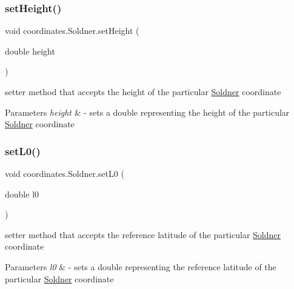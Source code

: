\subsubsection{\texorpdfstring{set\+Height()}{setHeight()}}
{\footnotesize\ttfamily void coordinates.\+Soldner.\+set\+Height (\begin{DoxyParamCaption}\item[{double}]{height }\end{DoxyParamCaption})}



setter method that accepts the height of the particular \hyperlink{classcoordinates_1_1_soldner}{Soldner} coordinate 


\begin{DoxyParams}{Parameters}
{\em height} & -\/ sets a double representing the height of the particular \hyperlink{classcoordinates_1_1_soldner}{Soldner} coordinate \\
\hline
\end{DoxyParams}
\mbox{\label{classcoordinates_1_1_soldner_abc6b1143ff0485b110cdc7b33f712ed3}} 
\subsubsection{\texorpdfstring{set\+L0()}{setL0()}}
{\footnotesize\ttfamily void coordinates.\+Soldner.\+set\+L0 (\begin{DoxyParamCaption}\item[{double}]{l0 }\end{DoxyParamCaption})}



setter method that accepts the reference latitude of the particular \hyperlink{classcoordinates_1_1_soldner}{Soldner} coordinate 


\begin{DoxyParams}{Parameters}
{\em l0} & -\/ sets a double representing the reference latitude of the particular \hyperlink{classcoordinates_1_1_soldner}{Soldner} coordinate \\
\hline
\end{DoxyParams}
\mbox{\label{classcoordinates_1_1_soldner_a991dbfcef201d4740613960da3794bf6}} 
